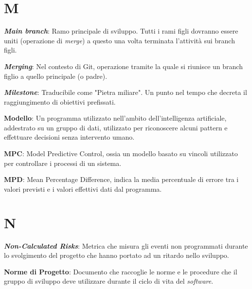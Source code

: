 \documentclass[5pt]{article}
\begin{document}
\section*{M}
\begin{flushleft}
	
\textbf{\textit{Main branch}}: Ramo principale di sviluppo. Tutti i rami figli dovranno essere uniti (operazione di \textit{merge}) a questo una volta terminata l'attività sui branch figli.\newline

\textbf{\textit{Merging}}: Nel contesto di Git, operazione tramite la quale si riunisce un branch figlio a quello principale (o padre).\newline

\textbf{\textit{Milestone}}: Traducibile come "Pietra miliare". Un punto nel tempo che decreta il raggiungimento di obiettivi prefissati.\newline
	
\textbf{Modello}: Un programma utilizzato nell'ambito dell'intelligenza artificiale, addestrato su un gruppo di dati, utilizzato per riconoscere alcuni pattern e effettuare decisioni senza intervento umano.\newline

\textbf{MPC}: Model Predictive Control, ossia un modello basato su vincoli utilizzato per controllare i processi di un sistema.\newline

\textbf{MPD}: Mean Percentage Difference, indica la media percentuale di errore tra i valori previsti e i valori effettivi dati dal programma.\newline

\end{flushleft}

\pagebreak

\section*{N}
\begin{flushleft}

\textbf{\textit{Non-Calculated Risks}}: Metrica che misura gli eventi non programmati durante lo svolgimento del progetto che hanno portato ad un ritardo nello sviluppo.\newline

\textbf{Norme di Progetto}: Documento che raccoglie le norme e le procedure che il gruppo di sviluppo deve utilizzare durante il ciclo di vita del \textit{software}.

\end{flushleft}
\end{document}
